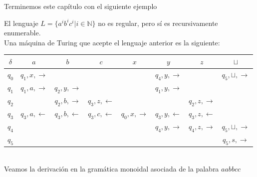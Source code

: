 \documentclass[../main.tex]{subfiles}
\begin{document}
Terminemos este capítulo con el siguiente ejemplo

\begin{ej}
	El lenguaje $L=\{ a^i b^i c^i | i \in \mathbb{N}\}$ no es regular, pero sí es recursivamente enumerable. \\
	Una máquina de Turing que acepte el lenguaje anterior es la siguiente: 
	
	\begin{tabular}{|c|c|c|c|c|c|c|c|}
		\hline
		$\delta$ & $a$ & $b$ & $c$ & $x$ & $y$ & $z$ & $\sqcup$  \\
		\hline
		$q_0$ & $q_1,x,\to$ &  &  &  & $q_4,y,\to$ &  & $q_5,\sqcup,\to$  \\
		\hline
		$q_1$ & $q_1,a,\to$ & $q_2,y,\to$ &  &  & $q_1,y,\to$ &  &    \\
		\hline
		$q_2$ &  & $q_2,b,\to$ & $q_3,z,\leftarrow$ &  &  & $q_2,z,\to$ &  \\
		\hline
		$q_3$ & $q_3,a,\leftarrow $ & $q_3,b,\leftarrow $ & $q_3,c,\leftarrow $ & $q_0,x,\to$ & $q_3,y,\leftarrow $ & $q_3,z,\leftarrow$ &    \\
		\hline
		$q_4$ &  &  &  &  & $q_4,y,\to$ & $q_4,z,\to$ & $q_5, \sqcup, \to$   \\
		\hline
		$q_5$ &  &  &  &  &  &  & $q_5,s,\to$ \\
		\hline
	\end{tabular}
	\\
    
    \noindent Veamos la derivación en la gramática monoidal asociada de la palabra $aabbcc$
\end{ej}
\newpage
\end{document}
